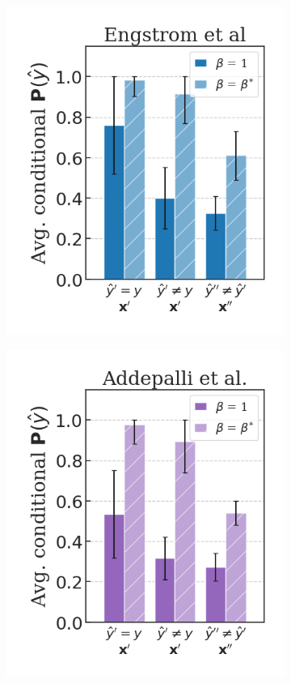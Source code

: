 \begin{figure}[H]
\begin{subfigure}[b]{0.3\textwidth}
        \includegraphics[width=\textwidth]{img/results_discussion/adversarial/Engstrom2019Robustness_short_PGD_0.0314_0.png}
    \end{subfigure}
    \begin{subfigure}[b]{0.3\textwidth}
        \centering
        \includegraphics[width=\textwidth]{img/results_discussion/adversarial/Addepalli2021Towards_RN18_short_PGD_0.0314_0.png}

\end{subfigure}
\end{figure}
